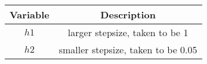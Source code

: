 \begin{tabular}[12pt]{ |c| c|}
	\hline
	\textbf{Variable} & \textbf{Description}\\ 
	\hline
	$h1$ & larger stepsize, taken to be 1\\
	\hline
	$h2$ & smaller stepsize, taken to be 0.05\\
	\hline
\end{tabular}